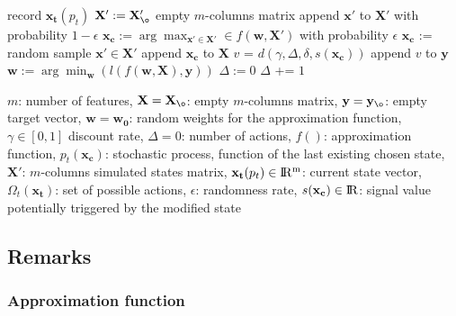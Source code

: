 \documentclass[scrartcl, 10.5 pt, conference]{ieeeconf}
\newcommand{\B}[1]{\mathbf{#1}}
\begin{document}
\begin{algorithm}

\begin{algorithmic}[1]

\vspace{3mm}
  \State record $\B{x_t}(p_t)$
    \State $\B{X'} :=\B{X'_{\o}}$ empty $m$-columns matrix
    \For{$\B{x'}$  in  $\Omega(\B{x_t})$}
      \State append  $\B{x'}$  to  $\B{X'}$
    \EndFor
    \State with probability  $1-\epsilon$
    \State \hspace{0.5cm} $\B{x_c}:=\arg\max_{\B{x'} \in \B{X'}} \in f(\B{w},\B{X'})$
    \State with probability  $\epsilon$
    \State \hspace{0.5cm} $\B{x_c}$ := random sample $\B{x'} \in \B{X'}$
    \State append $\B{x_c}$ to $\B{X}$
    \If{$s(\B{x_c})$  !=  $0$}
        \State $v$ = $d(\gamma, \Delta, \delta, s(\B{x_c}))$
        \State append  $v$  to  $\B{y}$
       \EndFor
      \State $\B{w} := \arg\min_{\B{w}}(l(f(\B{w},\B{X}),\B{y}))$
      \State $\Delta := 0$
    \Else
      \State $\Delta$ += $1$
    \EndIf
\EndWhile

\end{algorithmic}

\caption{}
\label{alg:algo}

\vspace{3mm}
\begin{small} $m$: number of features, $\B{X}=\B{X_{\o}}$: empty $m$-columns matrix, $\B{y}=\B{y_{\o}}$: empty target vector, $\B{w}=\B{w_0}$: random weights for the approximation function, $\gamma \in [0,1]$  discount rate, $\Delta = 0$: number of actions, $f()$: approximation function, $p_t(\B{x_c})$: stochastic process, function of the last existing chosen state, $\B{X'}$: $m$-columns simulated states matrix, $\B{x_t}(p_t) \in {\rm I\!R^m}$: current state vector, $\Omega_t(\B{x_t})$: set of possible actions, $\epsilon$: randomness rate, $s(\B{x_c}) \in {\rm I\!R}$: signal value potentially triggered by the modified state \end{small}

\end{algorithm}

\subsection{Remarks} 

\subsubsection{Approximation function} 
\end{document}
